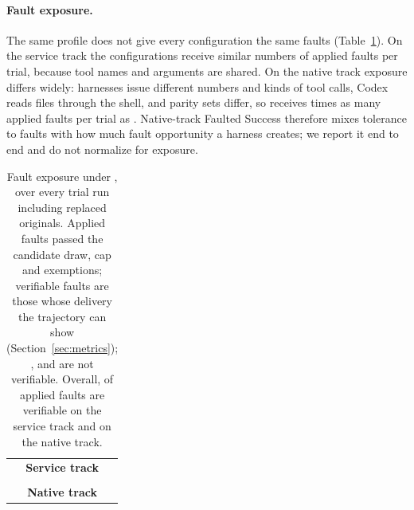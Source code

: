 \begin{table}[t]
\centering
\scriptsize

\caption{Service track,  profile. Completed is faulted trials that succeeded over faulted trials sent. Faulted Success is the mean over tasks (Section~\ref{sec:metrics}). Dollars per success are harness-reported.}
\label{tab:track-s}
\end{table}

\begin{table}[t]
\centering
\scriptsize

\caption{Native track,  profile; columns as in Table~\ref{tab:track-s}. Claude Code has one unit without a counted trial, so its Faulted Success (a mean over tasks) differs slightly from 87/107.}
\label{tab:track-n}
\end{table}

\paragraph{Fault exposure.}
The same profile does not give every configuration the same faults (Table~\ref{tab:exposure}).
On the service track the configurations receive similar numbers of applied faults per trial, because tool names and arguments are shared.
On the native track exposure differs widely: harnesses issue different numbers and kinds of tool calls, Codex reads files through the shell, and parity sets differ, so \cmcaTrackNFixedExposureMaxLabel{} receives \cmcaTrackNFixedExposureRatio{} times as many applied faults per trial as \cmcaTrackNFixedExposureMinLabel{}.
Native-track Faulted Success therefore mixes tolerance to faults with how much fault opportunity a harness creates; we report it end to end and do not normalize for exposure.

\begin{table}[t]
\centering
\scriptsize
\begin{tabular}{@{}c@{}}
\textbf{Service track}\\[2pt]
\\[6pt]
\textbf{Native track}\\[2pt]

\end{tabular}
\caption{Fault exposure under , over every trial run including replaced originals. Applied faults passed the candidate draw, cap and exemptions; verifiable faults are those whose delivery the trajectory can show (Section~\ref{sec:metrics}); ,  and  are not verifiable. Overall, \cmcaTrackSVerifiableShare{} of applied faults are verifiable on the service track and \cmcaTrackNFixedVerifiableShare{} on the native track.}
\label{tab:exposure}
\end{table}

